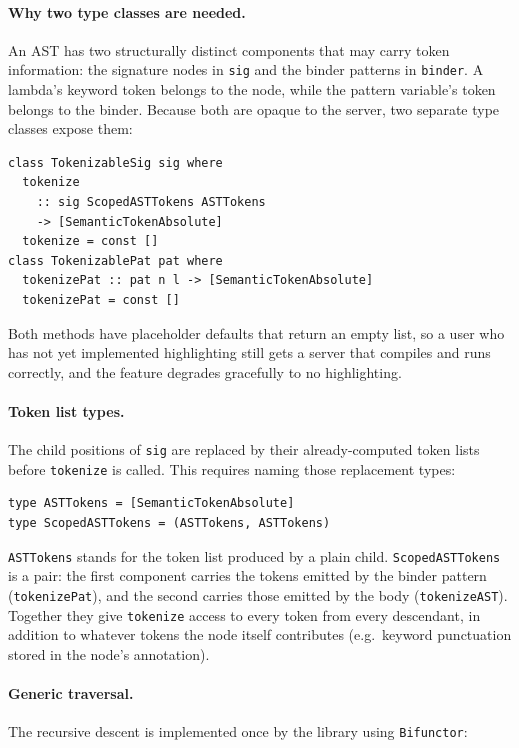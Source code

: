 \paragraph{Why two type classes are needed.}
An AST has two structurally distinct components that may carry token information: the signature nodes in \texttt{sig} and the binder patterns in \texttt{binder}.
A lambda's keyword token belongs to the node, while the pattern variable's token belongs to the binder.
Because both are opaque to the server, two separate type classes expose them:

\begin{verbatim}
class TokenizableSig sig where
  tokenize
    :: sig ScopedASTTokens ASTTokens
    -> [SemanticTokenAbsolute]
  tokenize = const []
class TokenizablePat pat where
  tokenizePat :: pat n l -> [SemanticTokenAbsolute]
  tokenizePat = const []
\end{verbatim}

Both methods have placeholder defaults that return an empty list, so a user who has not yet implemented highlighting still gets a server that compiles and runs correctly, and the feature degrades gracefully to no highlighting.

\paragraph{Token list types.}
The child positions of \texttt{sig} are replaced by their already-computed token lists before \texttt{tokenize} is called.
This requires naming those replacement types:

\begin{verbatim}
type ASTTokens = [SemanticTokenAbsolute]
type ScopedASTTokens = (ASTTokens, ASTTokens)
\end{verbatim}

\texttt{ASTTokens} stands for the token list produced by a plain child.
\texttt{ScopedASTTokens} is a pair: the first component carries the tokens emitted by the binder pattern (\texttt{tokenizePat}), and the second carries those emitted by the body (\texttt{tokenizeAST}).
Together they give \texttt{tokenize} access to every token from every descendant, in addition to whatever tokens the node itself contributes (e.g.\ keyword punctuation stored in the node's annotation).

\paragraph{Generic traversal.}
The recursive descent is implemented once by the library using \texttt{Bifunctor}:

